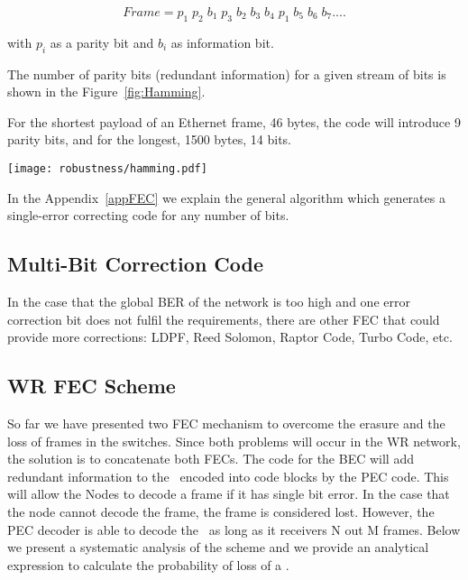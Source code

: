 \begin{equation}
	Frame =    p_1\;  p_2 \;  b_1 \;  p_3 \;  b_2 \;  b_3 \;  b_4 \;  p_1  \;  b_5 \; b_6  \; b_7 .... 
\end{equation}

with $p_i$ as a parity bit and $b_i$ as information bit. 


The number of parity bits (redundant information) for a given stream of bits is
shown in the Figure~\ref{fig:Hamming}.

For the shortest payload of an Ethernet frame, 46 bytes, the code will introduce
9 parity bits, and for the longest, 1500 bytes, 14 bits.

\begin{center}
        \texttt{[image: robustness/hamming.pdf]}
        \label{fig:Hamming}
\end{center}

In the Appendix~\ref{appFEC} we explain the general algorithm which generates a
single-error correcting code for any number of bits. 

\subsection{Multi-Bit Correction Code}

In the case that the global BER of the network is too high and one error
correction bit does not fulfil the requirements, there are other FEC that
could provide more corrections: LDPF, Reed Solomon, Raptor Code, Turbo
Code, etc.

\subsection{WR FEC Scheme}

So far we have presented two FEC mechanism to overcome the erasure and the loss of frames in the switches. Since both problems will occur in the WR network, the solution is to concatenate both FECs. The code for the BEC will add
redundant information to the \ControlMessage\ encoded into code blocks by the
PEC code. This will allow the Nodes to decode a frame if
it has single bit error. In the case that the node cannot decode the frame,
the frame is considered lost. However, the PEC decoder is able
to decode the \ControlMessage\ as long as it receivers N out M frames. Below we
present a systematic analysis of the scheme and we provide an analytical
expression to calculate the probability of loss of a \ControlMessage.


